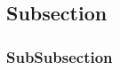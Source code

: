 \documentclass[../main]{subfiles}
\begin{document}
\blindtext\par

\subsection{Subsection}

\blindtext\par
\blindtext\par
\blindtext

\subsubsection{SubSubsection}

\blindtext\par
\end{document}

